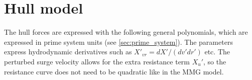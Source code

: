 \section{Hull model} \label{sec:hull}
The hull forces are expressed with the following general polynomials, which are expressed in prime system units (see \autoref{sec:prime_system}). The parameters express hydrodynamic derivatives such as ${X}'_{vr}=dX'/(dv'dr')$ etc.
The perturbed surge velocity allows for the extra resistance term ${X_u}'$, so the resistance curve does not need to be quadratic like in the MMG model.  
\begin{equation}
    \label{eq:X_H}
    
\end{equation}
%
\begin{equation}
    \label{eq:Y_H}
    
\end{equation}
%
\begin{equation}
    \label{eq:N_H}
    
\end{equation}